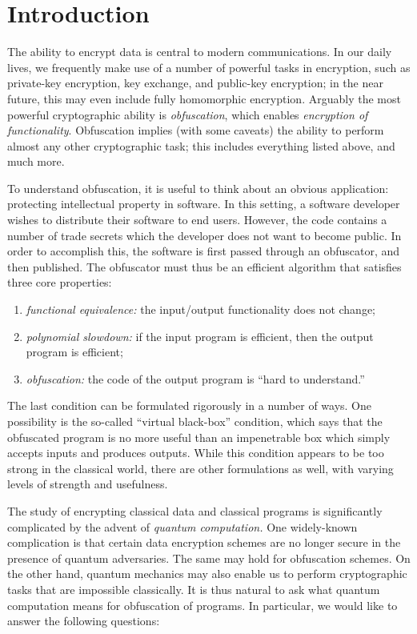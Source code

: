 \documentclass[11pt]{article}
\numberwithin{equation}{section}
\begin{document}
{%
\section{Introduction}\label{sec:intro}

The ability to encrypt data is central to modern communications. In our daily lives, we frequently make use of a number of powerful tasks in encryption, such as private-key encryption, key exchange, and public-key encryption; in the near future, this may even include fully homomorphic encryption. Arguably the most powerful cryptographic ability is \emph{obfuscation}, which enables \emph{encryption of functionality}. Obfuscation implies (with some caveats) the ability to perform almost any other cryptographic task; this includes everything listed above, and much more. 

To understand obfuscation, it is useful to think about an obvious application: protecting intellectual property in software. In this setting, a software developer wishes to distribute their software to end users. However, the code contains a number of trade secrets which the developer does not want to become public. In order to accomplish this, the software is first passed through an obfuscator, and then published. The obfuscator must thus be an efficient algorithm that satisfies three core properties: 
\begin{enumerate}\label{def:obf-informal}
\item \emph{functional equivalence:} the input/output functionality does not change;
\item \emph{polynomial slowdown:} if the input program is efficient, then the output program is efficient;
\item \emph{obfuscation:} the code of the output program is ``hard to understand.''
\end{enumerate}
The last condition can be formulated rigorously in a number of ways. One possibility is the so-called ``virtual black-box'' condition, which says that the obfuscated program is no more useful than an impenetrable box which simply accepts inputs and produces outputs. While this condition appears to be too strong in the classical world, there are other formulations as well, with varying levels of strength and usefulness.

The study of encrypting classical data and classical programs is significantly complicated by the advent of \emph{quantum computation.} One widely-known complication is that certain data encryption schemes are no longer secure in the presence of quantum adversaries. The same may hold for obfuscation schemes. On the other hand, quantum mechanics may also enable us to perform cryptographic tasks that are impossible classically. It is thus natural to ask what quantum computation means for obfuscation of programs. In particular, we would like to answer the following questions:

}
\end{document}

